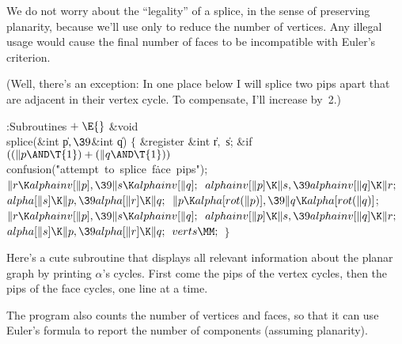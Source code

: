 We do not worry about the ``legality'' of a splice, in the sense
of preserving planarity, because we'll use  only to
reduce the number of vertices. Any illegal usage would cause the
final number of faces to be incompatible with Euler's criterion.

(Well, there's an exception: In one place below I will splice two
pips apart that are adjacent in their vertex cycle. To compensate,
I'll increase  by~2.)

\Y\B\4:Subroutines\X${}\mathrel+\E{}$\6
\&{void} \\{splice}(\&{int} \|p${},\39{}$\&{int} \|q)\1\1\2\2\6
${}\{{}$\1\6
\&{register} \&{int} \|r${},{}$ \|s;\7
\&{if} ${}((\|p\AND\T{1})+(\|q\AND\T{1})){}$\1\5
\\{confusion}(\.{"attempt\ to\ splice\ f}\)\.{ace\ pips"});\2\6
${}\|r\K\\{alphainv}[\|p],\39\|s\K\\{alphainv}[\|q];{}$\6
${}\\{alphainv}[\|p]\K\|s,\39\\{alphainv}[\|q]\K\|r;{}$\6
${}\\{alpha}[\|s]\K\|p,\39\\{alpha}[\|r]\K\|q;{}$\6
${}\|p\K\\{alpha}[\\{rot}(\|p)],\39\|q\K\\{alpha}[\\{rot}(\|q)]{}$;\6
${}\|r\K\\{alphainv}[\|p],\39\|s\K\\{alphainv}[\|q];{}$\6
${}\\{alphainv}[\|p]\K\|s,\39\\{alphainv}[\|q]\K\|r;{}$\6
${}\\{alpha}[\|s]\K\|p,\39\\{alpha}[\|r]\K\|q;{}$\6
${}\\{verts}\MM;{}$\6
\4${}\}{}$\2\par
\fi

Here's a cute subroutine that displays all
relevant information about
the planar graph by printing $\alpha$'s cycles. First come the pips
of the vertex cycles, then the pips of the face cycles, one line at a time.

The program also counts the number of vertices and faces, so that
it can use Euler's formula to report the number of components (assuming
planarity).

